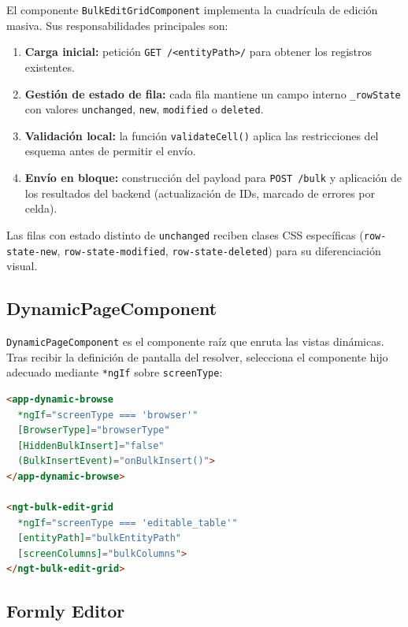 El componente \texttt{BulkEditGridComponent} implementa la cuadrícula de edición masiva.
Sus responsabilidades principales son:

\begin{enumerate}
  \item \textbf{Carga inicial:} petición \texttt{GET /<entityPath>/} para obtener los
    registros existentes.
  \item \textbf{Gestión de estado de fila:} cada fila mantiene un campo interno
    \texttt{\_rowState} con valores \texttt{unchanged}, \texttt{new},
    \texttt{modified} o \texttt{deleted}.
  \item \textbf{Validación local:} la función \texttt{validateCell()} aplica las
    restricciones del esquema antes de permitir el envío.
  \item \textbf{Envío en bloque:} construcción del payload para \texttt{POST /bulk}
    y aplicación de los resultados del backend (actualización de IDs, marcado de
    errores por celda).
\end{enumerate}

Las filas con estado distinto de \texttt{unchanged} reciben clases CSS específicas
(\texttt{row-state-new}, \texttt{row-state-modified}, \texttt{row-state-deleted}) para
su diferenciación visual.

\subsection{DynamicPageComponent}
\label{subsec:dynamic-page}

\texttt{DynamicPageComponent} es el componente raíz que enruta las vistas dinámicas.
Tras recibir la definición de pantalla del resolver, selecciona el componente hijo
adecuado mediante \texttt{*ngIf} sobre \texttt{screenType}:

\begin{lstlisting}[language=html, caption={Selección de vista en dynamic-page.component.html (fragmento).}]
<app-dynamic-browse
  *ngIf="screenType === 'browser'"
  [BrowserType]="browserType"
  [HiddenBulkInsert]="false"
  (BulkInsertEvent)="onBulkInsert()">
</app-dynamic-browse>

<ngt-bulk-edit-grid
  *ngIf="screenType === 'editable_table'"
  [entityPath]="bulkEntityPath"
  [screenColumns]="bulkColumns">
</ngt-bulk-edit-grid>
\end{lstlisting}

\subsection{Formly Editor}
\label{subsec:formly-editor}

